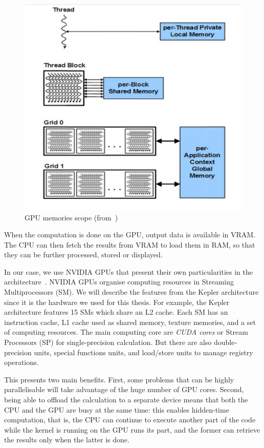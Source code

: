 \begin{figure}[h]
	\centering
	\includegraphics[width=0.6\linewidth]{gpu-memory-scope}
	\caption{GPU memories scope (from~\cite{nvidia:keplerarch})}
	\label{fig:gpu-memory-scope}
\end{figure}

When the computation is done on the GPU, output data is available in VRAM. The CPU can then fetch the results from VRAM to load them in RAM, so that they can be further processed, stored or displayed.

In our case, we use NVIDIA GPUs that present their own particularities in the architecture~\cite{nvidia:keplerarch}. NVIDIA GPUs organise computing resources in Streaming Multiprocessors (SM). We will describe the features from the Kepler architecture since it is the hardware we used for this thesis. For example, the Kepler architecture features 15 SMs which share an L2 cache. Each SM has an instruction cache, L1 cache used as shared memory, texture memories, and a set of computing resources. The main computing core are \emph{CUDA cores} or Stream Processors (SP) for single-precision calculation. But there are also double-precision units, special functions units, and load/store units to manage registry operations. 


This presents two main benefits. First, some problems that can be highly parallelisable will take advantage of the huge number of GPU cores. Second, being able to offload the calculation to a separate device means that both the CPU and the GPU are busy at the same time: this enables hidden-time computation, that is, the CPU can continue to execute another part of the code while the kernel is running on the GPU runs its part, and the former can retrieve the results only when the latter is done.

